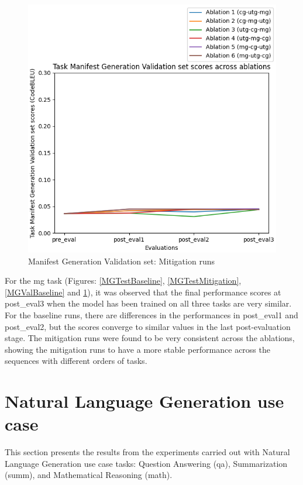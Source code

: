 \begin{figure}[H]
\begin{minipage}{0.45\textwidth}
        \includegraphics[width=1.1\textwidth]{Figures/results/code_mitigation_graphs/task_eval/seed_averaged_task_mg_val_eval_mitigation.png} %
        \captionsetup{width=1.1\textwidth}
        \caption{Manifest Generation Validation set: Mitigation runs}
        \label{MGValMitigation}
    \end{minipage}
\end{figure}
For the mg task (Figures: \ref{MGTestBaseline}, \ref{MGTestMitigation}, \ref{MGValBaseline} and \ref{MGValMitigation}), it was observed that the final performance scores at post\_eval3 when the model has been trained on all three tasks are very similar. For the baseline runs, there are differences in the performances in post\_eval1 and post\_eval2, but the scores converge to similar values in the last post-evaluation stage. The mitigation runs were found to be very consistent across the ablations, showing the mitigation runs to have a more stable performance across the sequences with different orders of tasks.

\section{Natural Language Generation use case}
This section presents the results from the experiments carried out with Natural Language Generation use case tasks: Question Answering (qa), Summarization (summ), and Mathematical Reasoning (math).

